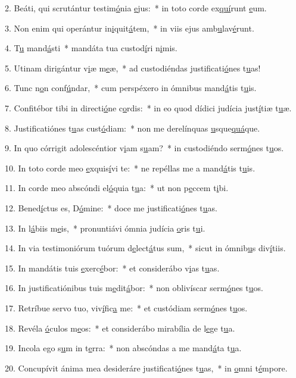 2. Beáti, qui scrutántur testim\uline{ó}nia \uline{e}jus:~* in toto corde ex\uline{quí}runt \uline{e}um.\par 
3. Non enim qui operántur in\uline{i}quit\uline{á}tem,~* in viis ejus amb\uline{u}lav\uline{é}runt.\par 
4. T\uline{u} mand\uline{á}sti~* mandáta tua custod\uline{í}ri n\uline{i}mis.\par 
5. Utinam dirigántur v\uline{i}æ m\uline{e}æ,~* ad custodiéndas justificati\uline{ó}nes t\uline{u}as!\par 
6. Tunc n\uline{o}n conf\uline{ú}ndar,~* cum perspéxero in ómnibus mand\uline{á}tis t\uline{u}is.\par 
7. Confitébor tibi in directi\uline{ó}ne c\uline{o}rdis:~* in eo quod dídici judícia just\uline{í}tiæ t\uline{u}æ.\par 
8. Justificatiónes t\uline{u}as cust\uline{ó}diam:~* non me derelínquas \uline{u}sque\uline{quá}que.\par 
9. In quo córrigit adolescéntior v\uline{i}am s\uline{u}am?~* in custodiéndo serm\uline{ó}nes t\uline{u}os.\par 
10. In toto corde meo \uline{e}xquis\uline{í}vi te:~* ne repéllas me a mand\uline{á}tis t\uline{u}is.\par 
11. In corde meo abscóndi el\uline{ó}quia t\uline{u}a:~* ut non p\uline{e}ccem t\uline{i}bi.\par 
12. Bened\uline{í}ctus es, D\uline{ó}mine:~* doce me justificati\uline{ó}nes t\uline{u}as.\par 
13. In l\uline{á}biis m\uline{e}is,~* pronuntiávi ómnia judícia \uline{o}ris t\uline{u}i.\par 
14. In via testimoniórum tuórum d\uline{e}lect\uline{á}tus sum,~* sicut in ómnib\uline{u}s div\uline{í}tiis.\par 
15. In mandátis tuis \uline{e}xerc\uline{é}bor:~* et considerábo v\uline{i}as t\uline{u}as.\par 
16. In justificatiónibus tuis m\uline{e}dit\uline{á}bor:~* non oblivíscar serm\uline{ó}nes t\uline{u}os.\par 
17. Retríbue servo tuo, viv\uline{í}fic\uline{a} me:~* et custódiam serm\uline{ó}nes t\uline{u}os.\par 
18. Revéla \uline{ó}culos m\uline{e}os:~* et considerábo mirabília de l\uline{e}ge t\uline{u}a.\par 
19. Incola ego s\uline{u}m in t\uline{e}rra:~* non abscóndas a me mand\uline{á}ta t\uline{u}a.\par 
20. Concupívit ánima mea desideráre justificati\uline{ó}nes t\uline{u}as,~* in \uline{o}mni t\uline{é}mpore.\par 
